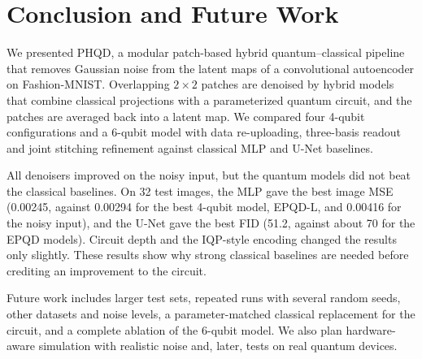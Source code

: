\section{Conclusion and Future Work}\label{sec:conclusion}
We presented PHQD, a modular patch-based hybrid quantum--classical pipeline that removes Gaussian noise from the latent maps of a convolutional autoencoder on Fashion-MNIST. Overlapping $2\times2$ patches are denoised by hybrid models that combine classical projections with a parameterized quantum circuit, and the patches are averaged back into a latent map. We compared four 4-qubit configurations and a 6-qubit model with data re-uploading, three-basis readout and joint stitching refinement against classical MLP and U-Net baselines.

All denoisers improved on the noisy input, but the quantum models did not beat the classical baselines. On 32 test images, the MLP gave the best image MSE (0.00245, against 0.00294 for the best 4-qubit model, EPQD-L, and 0.00416 for the noisy input), and the U-Net gave the best FID (51.2, against about 70 for the EPQD models). Circuit depth and the IQP-style encoding changed the results only slightly. These results show why strong classical baselines are needed before crediting an improvement to the circuit.

Future work includes larger test sets, repeated runs with several random seeds, other datasets and noise levels, a parameter-matched classical replacement for the circuit, and a complete ablation of the 6-qubit model. We also plan hardware-aware simulation with realistic noise and, later, tests on real quantum devices.
